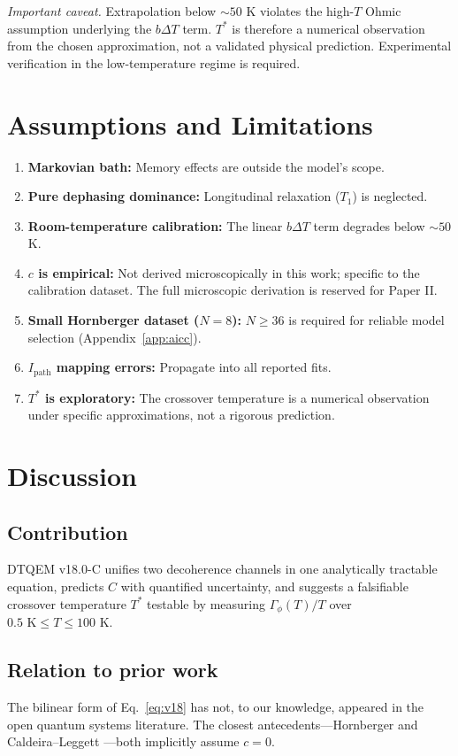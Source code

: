 \documentclass[aps,pra,reprint,amsmath,amssymb,superscriptaddress]{revtex4-2}
\begin{document}
\noindent\textit{Important caveat.} Extrapolation below $\sim 50$ K violates the high-$T$ Ohmic assumption underlying the $b\Delta T$ term. $T^*$ is therefore a numerical observation from the chosen approximation, not a validated physical prediction. Experimental verification in the low-temperature regime is required.

\section{Assumptions and Limitations}
\begin{enumerate}
    \item \textbf{Markovian bath:} Memory effects are outside the model's scope.
    \item \textbf{Pure dephasing dominance:} Longitudinal relaxation ($T_1$) is neglected.
    \item \textbf{Room-temperature calibration:} The linear $b\Delta T$ term degrades below $\sim 50$ K.
    \item \textbf{$c$ is empirical:} Not derived microscopically in this work; specific to the calibration dataset. The full microscopic derivation is reserved for Paper II.
    \item \textbf{Small Hornberger dataset ($N=8$):} $N \geq 36$ is required for reliable model selection (Appendix~\ref{app:aicc}).
    \item \textbf{$I_{\text{path}}$ mapping errors:} Propagate into all reported fits.
    \item \textbf{$T^*$ is exploratory:} The crossover temperature is a numerical observation under specific approximations, not a rigorous prediction.
\end{enumerate}

\section{Discussion}
\subsection{Contribution}
DTQEM v18.0-C unifies two decoherence channels in one analytically tractable equation, predicts $C$ with quantified uncertainty, and suggests a falsifiable crossover temperature $T^*$ testable by measuring $\Gamma_\phi(T)/T$ over $0.5 \text{ K} \leq T \leq 100 \text{ K}$.

\subsection{Relation to prior work}
The bilinear form of Eq.~\eqref{eq:v18} has not, to our knowledge, appeared in the open quantum systems literature. The closest antecedents---Hornberger \cite{Hornberger2003} and Caldeira--Leggett \cite{Weiss2012}---both implicitly assume $c=0$.
\end{document}
